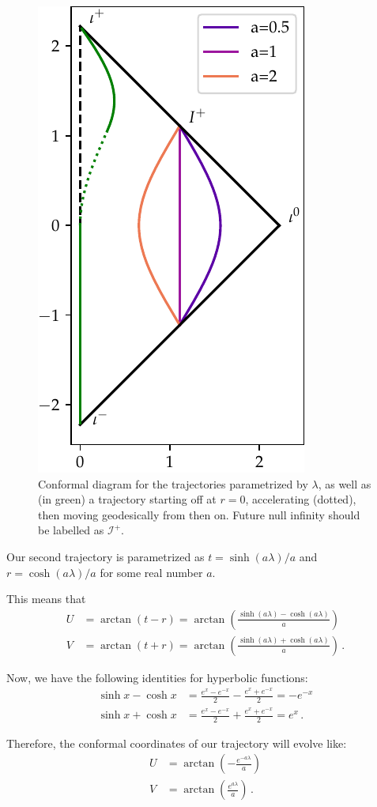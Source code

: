 \documentclass[main.tex]{subfiles}
\begin{document}
\begin{figure}[ht]
\centering
\includegraphics[width=.5\textwidth]{figures/conformal_trajectory}
\caption{Conformal diagram for the trajectories parametrized by \(\lambda \), as well as (in green) a trajectory starting off at \(r = 0\), accelerating (dotted), then moving geodesically from then on.
Future null infinity should be labelled as \(\mathscr{I}^+\). 
}
\label{fig:conformal_trajectory}
\end{figure}

Our second trajectory is parametrized as \(t = \sinh(a \lambda ) / a\) and \(r = \cosh(a \lambda ) / a\) 
for some real number \(a\).

This means that %
\begin{align}
U &= \arctan(t-r) = \arctan(\frac{\sinh(a \lambda ) - \cosh(a \lambda )}{a})  \\
V &= \arctan(t+r) = \arctan(\frac{\sinh(a \lambda ) + \cosh(a \lambda )}{a})
\,.
\end{align}

Now, we have the following identities for hyperbolic functions: 
%
\begin{align}
\sinh x - \cosh x &= \frac{e^x - e^{-x}}{2} - \frac{e^x + e^{-x}}{2} = - e^{-x}  \\
\sinh x + \cosh x &= \frac{e^x - e^{-x}}{2} + \frac{e^x + e^{-x}}{2} = e^{x}  
\,.
\end{align}

Therefore, the conformal coordinates of our trajectory will evolve like: 
%
\begin{align}
U &= \arctan(- \frac{e^{-a \lambda }}{a}) \\
V &= \arctan(\frac{e^{a \lambda }}{a})
\,.
\end{align}
\end{document}
